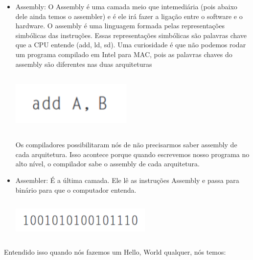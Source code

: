 \documentclass[12pt,a4paper]{report}
\begin{document}
	\begin{itemize}
		\item Assembly: O Assembly é uma camada meio que intemediária (pois abaixo dele ainda temos o assembler) e é ele irá fazer a ligação entre o software e o hardware. O assembly é uma linguagem formada pelas representações simbólicas das instruções. Essas representações simbólicas são palavras chave que a CPU entende (add, ld, sd). Uma curiosidade é que não podemos rodar um programa compilado em Intel para MAC, pois as palavras chaves do assembly são diferentes nas duas arquiteturas
		
		\begin{center}
			
			\includegraphics[width=6cm,height=3cm,keepaspectratio=false]{imagens-teoria/assembly.png}
			
		\end{center}
		
		Os compiladores possibilitaram nós de não precisarmos saber assembly de cada arquitetura. Isso acontece porque quando escrevemos nosso programa no alto nível, o compilador sabe o assembly de cada arquitetura.
	\end{itemize}
	
	\begin{itemize}
		\item Assembler: É a última camada. Ele lê as instruções Assembly e passa para binário para que o computador entenda.
		
		\begin{center}
			
			\includegraphics[width=7cm,height=2cm,keepaspectratio=false]{imagens-teoria/assembler.png}
			
		\end{center}
	\end{itemize}
	
	Entendido isso quando nós fazemos um Hello, World qualquer, nós temos:
	
\end{document}
